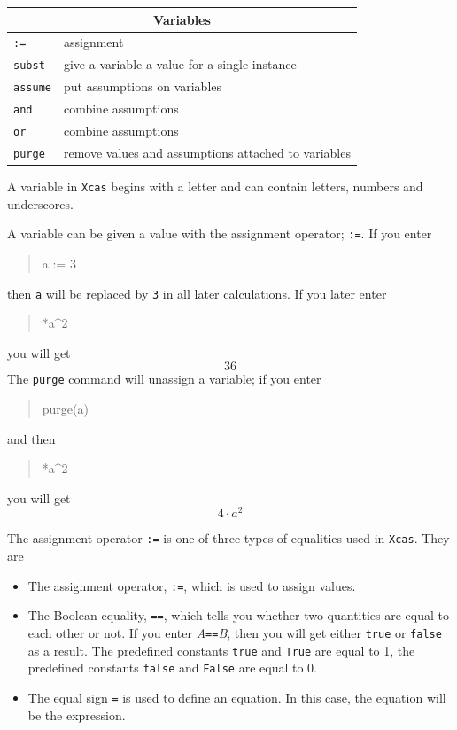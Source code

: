\documentclass{article}
\newcommand{\xcasin}[1]
{\begin{quote}\ttfamily
#1
\end{quote}}
\newcommand{\xcasout}[1]
{\begin{equation*}
#1
\end{equation*}}
\begin{document}
\begin{center}
\begin{tabular}{|p{}|p{}|}
\hline
\multicolumn{2}{|c|}{\textbf{Variables}}\\
\hline\hline
\texttt{:=}  & assignment \\
\texttt{subst} & give a variable a value for a single instance\\
\texttt{assume}   & put assumptions on variables \\
\texttt{and} & combine assumptions\\
\texttt{or} & combine assumptions\\
\texttt{purge}   & remove values and assumptions attached to variables \\
\hline
\end{tabular}
\end{center}

A variable in \texttt{Xcas} begins with a letter and can contain
letters, numbers and underscores.  

A variable can be given a value with the assignment operator; \texttt{:=}.
If you enter
\xcasin{a := 3}
then \texttt{a} will be replaced by \texttt{3} in all later
calculations.  If you later enter
\xcasin{4*a\^{}2}
you will get
\xcasout{36}
The \texttt{purge} command will unassign a variable; if you enter
\xcasin{purge(a)}
and then
\xcasin{4*a\^{}2}
you will get
\xcasout{4\cdot a^2}

The assignment operator \texttt{:=} is one of three types of
equalities used in \texttt{Xcas}.  They are
\begin{itemize}
  \item
  The assignment operator, \texttt{:=}, which is used to assign values.
  \item
  The Boolean equality, \texttt{==}, which tells you whether two
  quantities are equal to each other or not.  If you enter
  \textit{A}\texttt{==}\textit{B}, then you will get either
  \texttt{true} or \texttt{false} as a result.  The predefined
  constants \texttt{true} and \texttt{True} are equal to 1, the
  predefined constants \texttt{false} and \texttt{False} are equal to 0.
  \item
  The equal sign \texttt{=} is used to define an equation.  In this
  case, the equation will be the expression.
\end{itemize}
\end{document}
